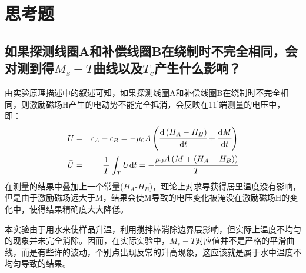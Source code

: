 \documentclass[a4paper]{article}
\begin{document}
\section{思考题}
\subsection{如果探测线圈A和补偿线圈B在绕制时不完全相同，会对测到得$M_s - T$曲线以及$T_c$产生什么影响？}
由实验原理描述中的叙述可知，如果探测线圈A和补偿线圈B在绕制时不完全相同，则激励磁场H产生的电动势不能完全抵消，会反映在11$^{'}$端测量的电压中，即：
\begin{eqnarray*}
    U &=& \epsilon_A - \epsilon_B = -\mu_0A\left(\cfrac{\text{d}\left(H_A - H_B\right)}{\text{d}t} + \cfrac{\text{d}M}{\text{d}t}\right)\\
    \bar{U} &=& \frac{1}{T}\int_{T}U\text{d}t = -\cfrac{\mu_0A\left(M + \left(H_A - H_B\right)\right)}{T}
\end{eqnarray*}
在测量的结果中叠加上一个常量($H_A$-$H_B$)，理论上对求导获得居里温度没有影响，但是由于激励磁场远大于M，结果会使M导致的电压变化被淹没在激励磁场H的变化中，使得结果精确度大大降低。

本实验由于用水来使样品升温，利用搅拌棒消除边界层影响，但实际上温度不均匀的现象并未完全消除。因而，在实际实验中，$M_s - T$对应值并不是严格的平滑曲线，而是有些许的波动，个别点出现反常的升高现象，这应该就是属于水中温度不均匀导致的结果。

\nocite{jiaocai}

\end{document}
